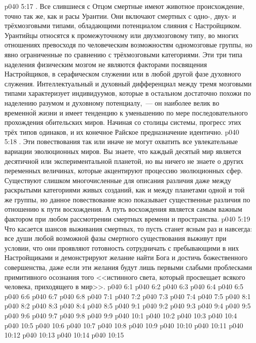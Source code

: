 \vs p040 5:17 \pc {}. Все слившиеся с Отцом смертные имеют животное происхождение, точно так же, как и расы Урантии. Они включают смертных с одно\hyp{}, двух\hyp{} и трёхмозговыми типами, обладающими потенциалом слияния с Настройщиком. Урантийцы относятся к промежуточному или двухмозговому типу, во многих отношениях превосходя по человеческим возможностям одномозговые группы, но явно ограниченные по сравнению с трёхмозговыми категориями. Эти три типа наделения физическим мозгом не являются факторами посвящения Настройщиков, в серафическом служении или в любой другой фазе духовного служения. Интеллектуальный и духовный дифференциал между тремя мозговыми типами характеризует индивидуумов, которые в остальном достаточно похожи по наделению разумом и духовному потенциалу,~--- он наиболее велик во временн\'ой жизни и имеет тенденцию к уменьшению по мере последовательного прохождения обительских миров. Начиная со столицы системы, прогресс этих трёх типов одинаков, и их конечное Райское предназначение идентично.
\vs p040 5:18 \pc {}. Эти повествования так или иначе не могут охватить все увлекательные вариации эволюционных миров. Вы знаете, что каждый десятый мир является десятичной или экспериментальной планетой, но вы ничего не знаете о других переменных величинах, которые акцентируют процессию эволюционных сфер. Существуют слишком многочисленные для описания различия даже между раскрытыми категориями живых созданий, как и между планетами одной и той же группы, но данное повествование ясно показывает существенные различия по отношению к пути восхождения. А путь восхождения является самым важным фактором при любом рассмотрении смертных времени и пространства.
\vs p040 5:19 \pc Что касается шансов выживания смертных, то пусть станет ясным раз и навсегда: все души любой возможной фазы смертного существования выживут при условии, что они проявляют готовность сотрудничать с пребывающими в них Настройщиками и демонстрируют желание найти Бога и достичь божественного совершенства, даже если эти желания будут лишь первыми слабыми проблесками примитивного осознания того <<истинного света, который просвещает всякого человека, приходящего в мир>>.
\vs p040 6:1 
\vs p040 6:2 
\vs p040 6:3 
\vs p040 6:4 
\vs p040 6:5 
\vs p040 6:6 
\vs p040 6:7 
\vs p040 6:8 
\vs p040 7:1 
\vs p040 7:2 
\vs p040 7:3 
\vs p040 7:4 
\vs p040 7:5 
\vs p040 8:1 
\vs p040 8:2 
\vs p040 8:3 
\vs p040 8:4 \pc 
\vs p040 8:5 
\vs p040 9:1 
\vs p040 9:2 \pc 
\vs p040 9:3 
\vs p040 9:4 \pc 
\vs p040 9:5 
\vs p040 9:6 
\vs p040 9:7 
\vs p040 9:8 \pc 
\vs p040 9:9 \pc 
{}
\vs p040 10:1 
\vs p040 10:2 
\vs p040 10:3 \pc 
\vs p040 10:4 
\vs p040 10:5 \pc 
\vs p040 10:6 \pc 
\vs p040 10:7 
\vs p040 10:8 \pc 
\vs p040 10:9 \pc 
\vs p040 10:10 
\vs p040 10:11 
\vs p040 10:12 
\vs p040 10:13 \pc 
\vs p040 10:14 
\vsetoff
\vs p040 10:15 
\quizlink
